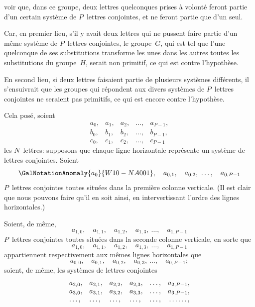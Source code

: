 voir que, dans ce groupe, deux lettres quelconques prises à volonté
feront partie d'un certain système de $P$~lettres conjointes,
et ne feront partie que d'un seul.

Car, en premier lieu, s'il y avait deux lettres qui ne pussent
faire partie d'un même système de $P$~lettres conjointes, le groupe~$G$,
qui est tel que l'une quelconque de ses substitutions transforme
les unes dans les autres toutes les substitutions du groupe~$H$,
serait non primitif, ce qui est contre l'hypothèse.

En second lieu, si deux lettres faisaient partie de plusieurs
systèmes différents, il s'ensuivrait que les groupes qui répondent
aux divers systèmes de $P$~lettres conjointes ne seraient pas primitifs,
ce qui est encore contre l'hypothèse.

Cela posé, soient
\[
\begin{array}{*{5}{l}}
a_{0}, & a_{1}, & a_{2}, & \dots, & a_{P-1}, \\
b_{0}, & b_{1}, & b_{2}, & \dots, & b_{P-1}, \\
c_{0}, & c_{1}, & c_{2}, & \dots, & c_{P-1}
\end{array}
\]
les $N$~lettres: supposons que chaque ligne horizontale représente
un système de lettres conjointes. Soient
\[
\GalNotationAnomaly{a_{0}}{W10-NA001},\quad a_{0,1}, \quad a_{0,2}, \ \dots, \quad a_{0,P-1}
\]
$P$~lettres conjointes toutes situées dans la première colonne verticale.
(Il est clair que nous pouvons faire qu'il en soit ainsi, en
intervertissant l'ordre des lignes horizontales.)

Soient, de même,
\[
a_{1,0}, \quad a_{1,1}, \quad a_{1,2}, \quad a_{1,3}, \ \dots, \quad a_{1,P-1}
\]
$P$~lettres conjointes toutes situées dans la seconde colonne verticale,
en sorte que
\[
a_{1,0}, \quad a_{1,1}, \quad a_{1,2}, \quad a_{1,3}, \ \dots, \quad a_{1,P-1}
\]
appartiennent respectivement aux mêmes lignes horizontales
que
\[
a_{0,0}, \quad a_{0,1}, \quad a_{0,2}, \quad a_{0,3}, \ \dots, \quad a_{0,P-1};
\]
soient, de même, les systèmes de lettres conjointes
\[
\begin{array}{*{6}{l}}
a_{2,0}, &a_{2,1}, &a_{2,2}, &a_{2,3}, & \dots, &a_{2,P-1}, \\
a_{3,0}, &a_{3,1}, &a_{3,2}, &a_{3,3}, & \dots, &a_{3,P-1}, \\
\dots,  & \dots,  & \dots, & \dots, & \dots, & \dotfill,
\end{array}
\]

